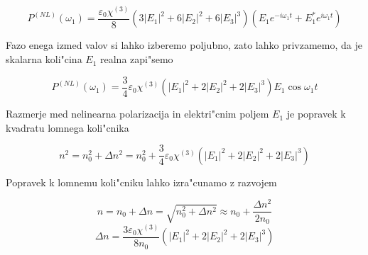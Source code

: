 \documentclass[a4paper,10pt]{article}
\begin{document}
$$P^{(NL)}(\omega_1) = \frac{\varepsilon_0\chi^{(3)}}{8}\left(3|E_1|^2 + 6|E_2|^2 + 6|E_3|^3\right)\left(E_1 e^{-i\omega_1 t} + E_1^*e^{i\omega_1 t}\right)$$

Fazo enega izmed valov si lahko izberemo poljubno, zato lahko privzamemo, da je skalarna koli"cina $E_1$ realna zapi"semo

$$P^{(NL)}(\omega_1) = \frac{3}{4}\varepsilon_0\chi^{(3)}\left(|E_1|^2 + 2|E_2|^2 + 2|E_3|^3\right)E_1 \cos \omega_1 t$$

Razmerje med nelinearna polarizacija in elektri"cnim poljem $E_1$ je popravek k kvadratu lomnega koli"cnika

$$n^2 = n_0^2 + \Delta n^2 = n_0^2 + \frac{3}{4}\varepsilon_0\chi^{(3)}\left(|E_1|^2 + 2|E_2|^2 + 2|E_3|^3\right)$$

Popravek k lomnemu koli"cniku lahko izra"cunamo z razvojem

$$n = n_0 + \Delta n = \sqrt{n_0^2 + \Delta n^2} \approx n_0 + \frac{\Delta n^2}{2n_0}$$
$$\Delta n = \frac{3\varepsilon_0\chi^{(3)}}{8n_0} \left(|E_1|^2 + 2|E_2|^2 + 2|E_3|^3\right)$$
\end{document}
